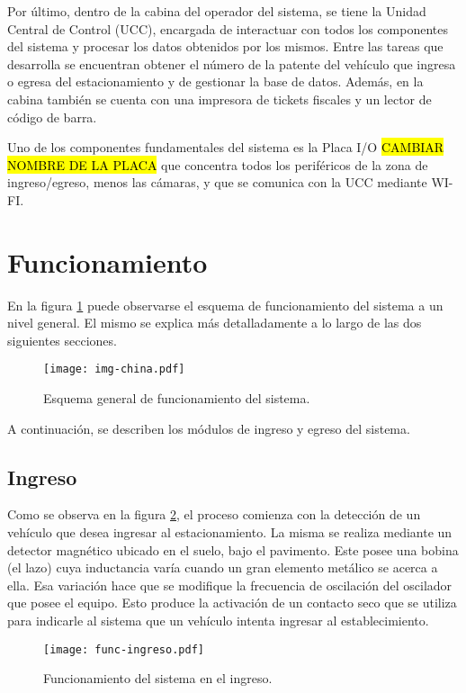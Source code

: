 Por último, dentro de la cabina del operador del sistema, se tiene la Unidad Central de Control (UCC), encargada de interactuar con todos los componentes del sistema y procesar los datos obtenidos por los mismos. Entre las tareas que desarrolla se encuentran obtener el número de la patente del vehículo que ingresa o egresa del estacionamiento y de gestionar la base de datos. Además, en la cabina también se cuenta con una impresora de tickets fiscales y un lector de código de barra.
 
Uno de los componentes fundamentales del sistema es la Placa I/O \hl{CAMBIAR NOMBRE DE LA PLACA} que concentra todos los periféricos de la zona de ingreso/egreso, menos las cámaras, y que se comunica con la UCC  mediante WI-FI.

\section{Funcionamiento}

En la figura \ref{fig:img_img-china} puede observarse el esquema de funcionamiento del sistema a un nivel general. El mismo se explica más detalladamente a lo largo de las dos siguientes secciones.

\begin{figure}[H]
	\centering
	\texttt{[image: img-china.pdf]}
	\caption{Esquema general de funcionamiento del sistema.}
	\label{fig:img_img-china}
\end{figure}

A continuación, se describen los módulos de ingreso y egreso del sistema.

\subsection{Ingreso}

Como se observa en la figura \ref{fig:img_ingreso}, el proceso comienza con la detección de un vehículo que desea ingresar al estacionamiento. La misma se realiza mediante un detector magnético ubicado en el suelo, bajo el pavimento. Este posee una bobina (el lazo) cuya inductancia varía cuando un gran elemento metálico se acerca a ella. Esa variación hace que se modifique la frecuencia de oscilación del oscilador que posee el equipo. Esto produce la activación de un contacto seco que se utiliza para indicarle al sistema que un vehículo intenta ingresar al establecimiento.

\begin{figure}[H]
	\centering
	\texttt{[image: func-ingreso.pdf]}
	\caption{Funcionamiento del sistema en el ingreso.}
	\label{fig:img_ingreso}
\end{figure}

